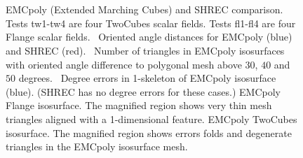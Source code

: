 \begin{figure}
	\centering
	\\
	\\
\caption{EMCpoly (Extended Marching Cubes) and SHREC comparison.
Tests tw1-tw4 are four TwoCubes scalar fields.
Tests fl1-fl4 are four Flange scalar fields.
\protect{}~Oriented angle distances for EMCpoly (blue)
and SHREC (red).
\protect{}~Number of triangles in EMCpoly isosurfaces
with oriented angle difference to polygonal mesh 
above $30$, $40$ and $50$ degrees.
\protect{}~Degree errors 
in 1-skeleton of EMCpoly isosurface (blue).
(SHREC has no degree errors for these cases.)
\protect{} EMCpoly Flange isosurface.
The magnified region shows very thin mesh triangles aligned
with a 1-dimensional feature.
\protect{} EMCpoly TwoCubes isosurface.
The magnified region shows errors folds and degenerate triangles
in the EMCpoly isosurface mesh.}	
\end{figure}


